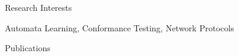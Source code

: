 \documentclass{resume} %
\begin{document}

\begin{rSection}{Research Interests}
\item Automata Learning, Conformance Testing, Network Protocols  
\end{rSection}



\begin{rSection}{Publications}

\item {}
\smallskip{}
\item {}
\smallskip{}
\item {}
\smallskip{}
\item {}
\smallskip{}
\item {}
\smallskip{}
\item {}
\smallskip{}
\item {}
%
%
\end{rSection}

\end{document}
